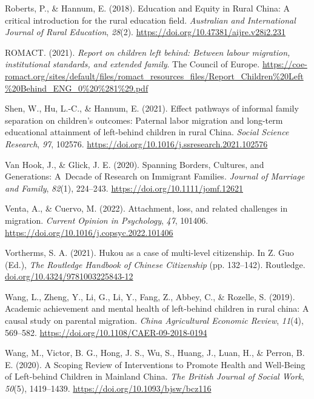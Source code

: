 \documentclass[
  man,floatsintext]{apa7}
\newlength{\cslhangindent}
\newlength{\cslentryspacingunit} %
\newenvironment{CSLReferences}[2] %
 {%
  \setlength{\parindent}{0pt}
  \ifodd #1
  \let\oldpar\par
  \def\par{\hangindent=\cslhangindent\oldpar}
  \fi
  \setlength{\parskip}{#2\cslentryspacingunit}
 }%
 {}
\begin{document}
\begin{CSLReferences}{1}{0}
\leavevmode{}%
Roberts, P., \& Hannum, E. (2018). Education and Equity in Rural China: A critical introduction for the rural education field. \emph{Australian and International Journal of Rural Education}, \emph{28}(2). \url{https://doi.org/10.47381/aijre.v28i2.231}

\leavevmode{}%
ROMACT. (2021). \emph{Report on children left behind: Between labour migration, institutional standards, and extended family}. The Council of Europe. \url{https://coe-romact.org/sites/default/files/romact_resources_files/Report_Children\%20Left\%20Behind_ENG_0\%20\%281\%29.pdf}

\leavevmode{}%
Shen, W., Hu, L.-C., \& Hannum, E. (2021). Effect pathways of informal family separation on children's outcomes: Paternal labor migration and long-term educational attainment of left-behind children in rural China. \emph{Social Science Research}, \emph{97}, 102576. \url{https://doi.org/10.1016/j.ssresearch.2021.102576}

\leavevmode{}%
Van Hook, J., \& Glick, J. E. (2020). Spanning Borders, Cultures, and Generations: A~Decade of Research on Immigrant Families. \emph{Journal of Marriage and Family}, \emph{82}(1), 224--243. \url{https://doi.org/10.1111/jomf.12621}

\leavevmode{}%
Venta, A., \& Cuervo, M. (2022). Attachment, loss, and related challenges in migration. \emph{Current Opinion in Psychology}, \emph{47}, 101406. \url{https://doi.org/10.1016/j.copsyc.2022.101406}

\leavevmode{}%
Vortherms, S. A. (2021). Hukou as a case of multi-level citizenship. In Z. Guo (Ed.), \emph{The Routledge Handbook of Chinese Citizenship} (pp. 132--142). Routledge. \href{https://doi.org/10.4324/9781003225843-12}{doi.org/10.4324/9781003225843-12}

\leavevmode{}%
Wang, L., Zheng, Y., Li, G., Li, Y., Fang, Z., Abbey, C., \& Rozelle, S. (2019). Academic achievement and mental health of left-behind children in rural china: A causal study on parental migration. \emph{China Agricultural Economic Review}, \emph{11}(4), 569--582. \url{https://doi.org/10.1108/CAER-09-2018-0194}

\leavevmode{}%
Wang, M., Victor, B. G., Hong, J. S., Wu, S., Huang, J., Luan, H., \& Perron, B. E. (2020). A Scoping Review of Interventions to Promote Health and Well-Being of Left-behind Children in Mainland China. \emph{The British Journal of Social Work}, \emph{50}(5), 1419--1439. \url{https://doi.org/10.1093/bjsw/bcz116}


\end{CSLReferences}
\end{document}
